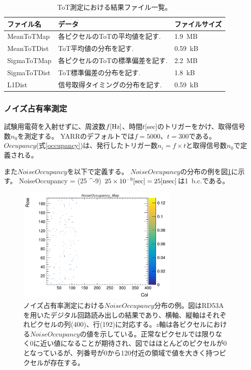 \begin{table}[tbp]
\begin{center}
\caption[ToT測定における結果ファイル一覧]{ToT測定における結果ファイル一覧。}
\label{tot_result_files}
  \small
  \begin{tabular}{|lll|} \hline
    ファイル名 & データ & ファイルサイズ \\ \hline
    MeanToTMap   & 各ピクセルのToTの平均値を記す.   & 1.9~MB \\ 
    MeanToTDist  & ToT平均値の分布を記す.           & 0.59~kB \\ 
    SigmaToTMap  & 各ピクセルのToTの標準偏差を記す. & 2.2~MB \\ 
    SigmaToTDist & ToT標準偏差の分布を記す.         & 1.8~kB \\ 
    L1Dist       & 信号取得タイミングの分布を記す.  & 0.59~kB \\ \hline 
  \end{tabular}
\end{center}
\end{table}

\subsubsection{ノイズ占有率測定}
試験用電荷を入射せずに、周波数$f[{\rm Hz}]$、時間$t$[sec]のトリガーをかけ、取得信号数$n_0$を測定する。
YARRのデフォルトでは$f=5000、t=300$である。
$Occupancy$(式\ref{occupancy})は、発行したトリガー数$n_i=f \times t$と取得信号数$n_0$で定義される。

また$NoiseOccupancy$を以下で定義する。
$NoiseOccupancy$の分布の例を図\ref{noise_occ}に示す。
\bbb
NoiseOccupancy =  \times (25 ^{-9})
\eee
$25 \times 10^{-9}[{\rm sec}]=25[{\rm nsec}]$は1~b.c.である。

\begin{figure}[bpt]\centering
\includegraphics[width=8cm]{./noise_occ.png}
\caption[ノイズ占有率測定における$NoiseOccupancy$分布の例。]{ノイズ占有率測定における$NoiseOccupancy$分布の例。図はRD53Aを用いたデジタル回路読み出しの結果であり、横軸、縦軸はそれぞれピクセルの列(400)、行(192)に対応する。$z$軸は各ピクセルにおける$NoiseOccupancy$の値を示している。正常なピクセルでは限りなく0に近い値になることが期待され、図ではほとんどのピクセルが0となっているが、列番号が0から120付近の領域で値を大きく持つピクセルが存在する。}
\label{noise_occ}
\end{figure}

